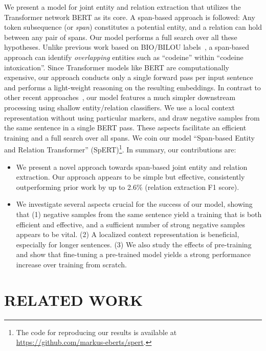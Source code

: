 \documentclass{ecai}
\begin{document}
We present a model for joint entity and relation extraction that utilizes the Transformer network BERT as its core. A span-based approach is followed: Any token subsequence (or {\it span}) constitutes a potential entity, and a relation can hold between any pair of spans. Our model performs a full search over all these hypotheses. Unlike previous work based on BIO/BILOU labels~\cite{bekoulis:2018:multi_head,li:2019:joint_bert,nguyen:2019:biaffine_attention}, a span-based approach can identify {\it overlapping} entities such as ``codeine'' within ``codeine intoxication''.
Since Transformer models like BERT are computationally expensive, our approach conducts only a single forward pass per input sentence and performs a light-weight reasoning on the resulting embeddings. In contrast to other recent approaches~\cite{luan:2019:span_graphs,wadden:2019:dygie++}, our model features a much simpler downstream processing using shallow entity/relation classifiers.
We use a local context representation without using particular markers, and draw negative samples from the same sentence in a single BERT pass. These aspects facilitate an efficient training and a full search over all spans.
We coin our model ``Span-based Entity and Relation Transformer'' (SpERT)\footnote{The code for
reproducing our results is available at \\ \href{https://github.com/markus-eberts/spert}{https://github.com/markus-eberts/spert}.}. 
In summary, our contributions are:
\begin{itemize}
\item We present a novel approach towards span-based joint entity and relation extraction. 
    Our approach appears to be simple but effective, consistently outperforming prior work by up to 2.6\% (relation extraction F1 score). 
    \item We investigate several aspects crucial for the success of our model, showing that (1) negative samples from the same sentence yield a training that is both efficient and effective, and a sufficient number of strong negative samples appears to be vital. (2) A localized context representation is beneficial, especially for longer sentences. (3) We also study the effects of pre-training and show that fine-tuning a pre-trained model yields a strong performance increase over training from scratch. \end{itemize}

\section{RELATED WORK}
\end{document}
